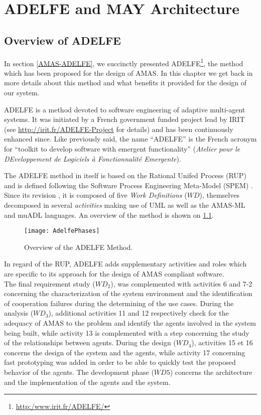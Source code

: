 \chapter{ADELFE and MAY Architecture}\label{ADELFE_chapter}

\section{Overview of ADELFE}

In section \ref{AMAS-ADELFE}, we succinctly presented ADELFE\footnote{\url{http:/www.irit.fr/ADELFE/}}, the method which has been proposed for the design of AMAS. In this chapter we get back in more details about this method and what benefits it provided for the design of our system. 

ADELFE is a method devoted to software engineering of adaptive multi-agent systems. It was initiated by a French government funded project lead by IRIT (see \url{http://irit.fr/ADELFE-Project} for details) and has been continuously enhanced since. Like previously said, the name \enquote{ADELFE} is the French acronym for \enquote{toolkit to develop software with emergent functionality} (\textit{Atelier pour le DEveloppement de Logiciels à Fonctionnalité Emergente}).

The ADELFE method in itself is based on the Rational Unifed Process (RUP) and is defined following the Software Process Engineering Meta-Model (SPEM) \cite{PiGl2004.1,BeCaGlPi2005.1}. Since its revision \cite{Ro2008.3}, it is composed of five \emph{Work Definitions} ($WD$), themselves decomposed in several \emph{activities} making use of UML as well as the AMAS-ML and muADL languages. An overview of the method is shown on \figurename{} \ref{ADELFE_phases}.

\begin{figure}
\centering
\texttt{[image: AdelfePhases]}
\caption{Overview of the ADELFE Method.}\label{ADELFE_phases}
\end{figure}

In regard of the RUP, ADELFE adds supplementary activities and roles which are specific to its approach for the design of AMAS compliant software.\\
The final requirement study ($WD_2$), was complemented with activities 6 and 7-2 concerning the characterization of the system environment and the identification of cooperation failures during the determining of the use cases. During the analysis ($WD_3$), additional activities 11 and 12 respectively check for the adequacy of AMAS to the problem and identify the agents involved in the system being built, while activity 13 is complemented with a step concerning the study of the relationships between agents. During the design ($WD_4$), activities 15 et 16 concerns the design of the system and the agents, while activity 17 concerning fast prototyping was added in order to be able to quickly test the proposed behavior of the agents. The development phase ($WD5$) concerns the architecture and the implementation of the agents and the system.

